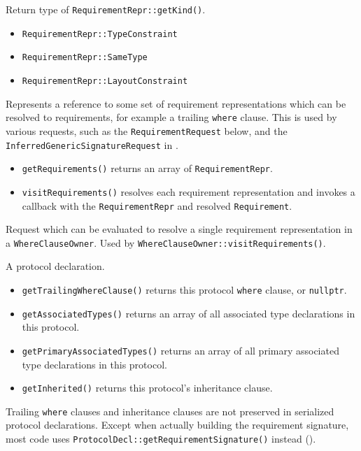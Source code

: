 \documentclass[../generics]{subfiles}
\begin{document}
Return type of \texttt{RequirementRepr::getKind()}.
\begin{itemize}
\item \texttt{RequirementRepr::TypeConstraint}
\item \texttt{RequirementRepr::SameType}
\item \texttt{RequirementRepr::LayoutConstraint}
\end{itemize}

Represents a reference to some set of requirement representations which can be resolved to requirements, for example a trailing \texttt{where} clause. This is used by various requests, such as the \texttt{RequirementRequest} below, and the \texttt{InferredGenericSignatureRequest} in .
\begin{itemize}
\item \texttt{getRequirements()} returns an array of \texttt{RequirementRepr}.
\item \texttt{visitRequirements()} resolves each requirement representation and invokes a callback with the \texttt{RequirementRepr} and resolved \texttt{Requirement}.
\end{itemize}

Request which can be evaluated to resolve a single requirement representation in a \texttt{WhereClauseOwner}. Used by \texttt{WhereClauseOwner::visitRequirements()}.

A protocol declaration.
\begin{itemize}
\item \texttt{getTrailingWhereClause()} returns this protocol \texttt{where} clause, or \texttt{nullptr}.
\item \texttt{getAssociatedTypes()} returns an array of all associated type declarations in this protocol.
\item \texttt{getPrimaryAssociatedTypes()} returns an array of all primary associated type declarations in this protocol.
\item \texttt{getInherited()} returns this protocol's inheritance clause.
\end{itemize}

Trailing \texttt{where} clauses and inheritance clauses are not preserved in serialized protocol declarations. Except when actually building the requirement signature, most code uses \texttt{ProtocolDecl::getRequirementSignature()} instead ().
\end{document}
